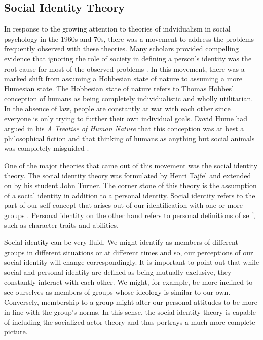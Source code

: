 \documentclass[rutwik_proposal.tex]{subfiles}
\begin{document}
\subsection{Social Identity Theory}\label{subsec:socidentity}

In response to the growing attention to theories of indvidualism in social psychology in the 1960s and 70s, there was a movement to address the problems frequently observed with these theories. Many scholars provided compelling evidence that ignoring the role of society in defining a person's identity was the root cause for most of the observed problems \cite{Brewer79, Cancian75}. In this movement, there was a marked shift from assuming a Hobbesian state of nature to assuming a more Humesian state. The Hobbesian state of nature refers to Thomas Hobbes' conception of humans as being completely individualistic and wholly utilitarian. In the absence of law, people are constantly at war with each other since everyone is only trying to further their own individual goals. David Hume had argued in his \textit{A Treatise of Human Nature} that this conception was at best a philosophical fiction and that thinking of humans as anything but social animals was completely misguided \cite{Hume1739}.

One of the major theories that came out of this movement was the social identity theory. The social identity theory was formulated by Henri Tajfel and extended on by his student John Turner. The corner stone of this theory is the assumption of a social identity in addition to a personal identity. Social identity refers to the part of our self-concept that arises out of our identification with one or more groups \cite{Tajfel81, Turner86}. Personal identity on the other hand refers to personal definitions of self, such as character traits and abilities. 

Social identity can be very fluid. We might identify as members of different groups in different situations or at different times and so, our perceptions of our social identity will change correspondingly. It is important to point out that while social and personal identity are defined as being mutually exclusive, they constantly interact with each other. We might, for example, be more inclined to see ourselves as members of groups whose ideology is similar to our own. Conversely, membership to a group might alter our personal attitudes to be more in line with the group's norms. In this sense, the social identity theory is capable of including the socialized actor theory and thus portrays a much more complete picture.
\end{document}
